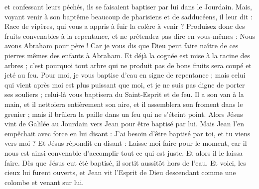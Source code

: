 \begin{multicols}{2}
et confessant leurs péchés, ils se faisaient baptiser par lui dans le Jourdain.
Mais, voyant venir à son baptême beaucoup de pharisiens et de sadducéens, il leur dit : Race de vipères, qui vous a appris à fuir la colère à venir ?
Produisez donc des fruits convenables à la repentance,
et ne prétendez pas dire en vous-mêmes : Nous avons Abraham pour père ! Car je vous dis que Dieu peut faire naître de ces pierres mêmes des enfants à Abraham.
Et déjà la cognée est mise à la racine des arbres ; c'est pourquoi tout arbre qui ne produit pas de bons fruits sera coupé et jeté au feu.
Pour moi, je vous baptise d'eau en signe de repentance ; mais celui qui vient après moi est plus puissant que moi, et je ne suis pas digne de porter ses souliers ; celui-là vous baptisera du Saint-Esprit et de feu.
Il a son van à la main, et il nettoiera entièrement son aire, et il assemblera son froment dans le grenier ; mais il brûlera la paille dans un feu qui ne s'éteint point.
Alors Jésus vint de Galilée au Jourdain vers Jean pour être baptisé par lui.
Mais Jean l'en empêchait avec force en lui disant : J'ai besoin d'être baptisé par toi, et tu viens vers moi ?
Et Jésus répondit en disant : Laisse-moi faire pour le moment, car il nous est ainsi convenable d'accomplir tout ce qui est juste. Et alors il le laissa faire.
Dès que Jésus eut été baptisé, il sortit aussitôt hors de l'eau. Et voici, les cieux lui furent ouverts, et Jean vit l'Esprit de Dieu descendant comme une colombe et venant sur lui.

\end{multicols}
